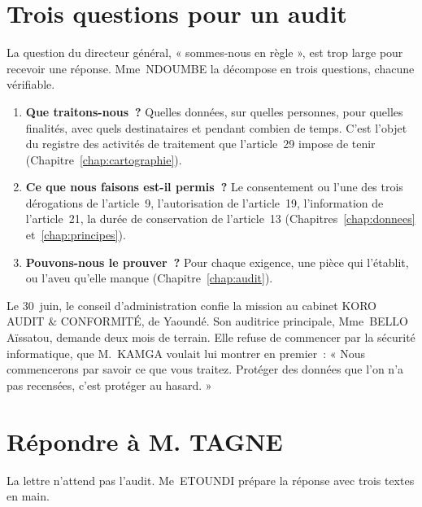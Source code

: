 \section{Trois questions pour un audit}
\label{sec:p00-questions}

La question du directeur général, « sommes-nous en règle », est trop large
pour recevoir une réponse. Mme~NDOUMBE la décompose en trois questions,
chacune vérifiable.

\begin{enumerate}
    \item \textbf{Que traitons-nous~?} Quelles données, sur quelles
          personnes, pour quelles finalités, avec quels destinataires et
          pendant combien de temps. C'est l'objet du registre des activités
          de traitement que l'article~29 impose de tenir
          (Chapitre~\ref{chap:cartographie}).
    \item \textbf{Ce que nous faisons est-il permis~?} Le consentement
          ou l'une des trois dérogations de l'article~9, l'autorisation de
          l'article~19, l'information de l'article~21, la durée de
          conservation de l'article~13 (Chapitres~\ref{chap:donnees}
          et~\ref{chap:principes}).
    \item \textbf{Pouvons-nous le prouver~?} Pour chaque exigence, une
          pièce qui l'établit, ou l'aveu qu'elle manque
          (Chapitre~\ref{chap:audit}).
\end{enumerate}

Le 30~juin, le conseil d'administration confie la mission au cabinet KORO
AUDIT \& CONFORMITÉ, de Yaoundé. Son auditrice principale, Mme~BELLO
Aïssatou, demande deux mois de terrain. Elle refuse de commencer par la
sécurité informatique, que M.~KAMGA voulait lui montrer en premier~: « Nous
commencerons par savoir ce que vous traitez. Protéger des données que l'on
n'a pas recensées, c'est protéger au hasard. »

\section{Répondre à M. TAGNE}
\label{sec:p00-reponse}

La lettre n'attend pas l'audit. Me~ETOUNDI prépare la réponse avec trois
textes en main.

